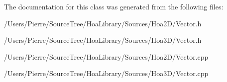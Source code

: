 The documentation for this class was generated from the following files\-:\begin{DoxyCompactItemize}
\item 
/\-Users/\-Pierre/\-Source\-Tree/\-Hoa\-Library/\-Sources/\-Hoa2\-D/Vector.\-h\item 
/\-Users/\-Pierre/\-Source\-Tree/\-Hoa\-Library/\-Sources/\-Hoa3\-D/Vector.\-h\item 
/\-Users/\-Pierre/\-Source\-Tree/\-Hoa\-Library/\-Sources/\-Hoa2\-D/Vector.\-cpp\item 
/\-Users/\-Pierre/\-Source\-Tree/\-Hoa\-Library/\-Sources/\-Hoa3\-D/Vector.\-cpp\end{DoxyCompactItemize}
